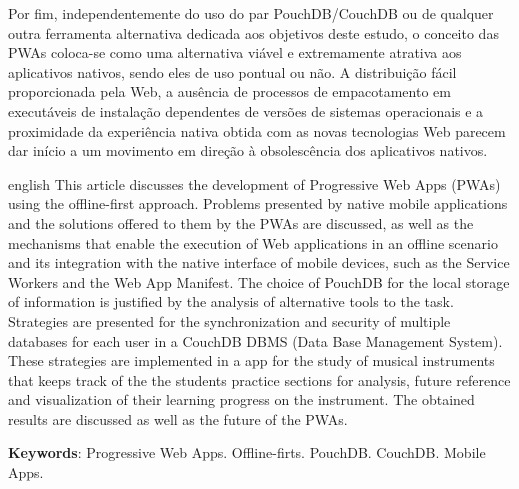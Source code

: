 \documentclass[
	article,			%
	11pt,				%
	oneside,			%
	a4paper,			%
	english,			%
	brazil,				%
	sumario=tradicional
	]{abntex2}
\begin{document}
Por fim, independentemente do uso do par PouchDB/CouchDB ou de qualquer outra ferramenta alternativa dedicada aos objetivos deste estudo, o conceito das PWAs coloca-se como uma alternativa viável e extremamente atrativa aos aplicativos nativos, sendo eles de uso pontual ou não. A distribuição fácil proporcionada pela Web, a ausência de processos de empacotamento em executáveis de instalação dependentes de versões de sistemas operacionais e a proximidade da experiência nativa obtida com as novas tecnologias Web parecem dar início a um movimento em direção à obsolescência dos aplicativos nativos.

\postextual



\emptythanks
\maketitle

\renewcommand{\resumoname}{Abstract}
\begin{resumoumacoluna}
 \begin{otherlanguage*}{english}
   This article discusses the development of Progressive Web Apps (PWAs) using
   the offline-first approach. Problems presented by native mobile applications and the solutions offered to them by the PWAs are discussed, as well as the mechanisms that enable the execution of Web applications in an offline scenario and its integration with the native interface of mobile devices, such as the Service Workers and the
   Web App Manifest. The choice of PouchDB for the local storage of information
   is justified by the analysis of alternative tools to the task. Strategies are
   presented for the synchronization and security of multiple databases for
   each user in a CouchDB DBMS (Data Base Management System). These strategies are implemented in a app for the study of musical instruments that keeps track of the the students practice sections for analysis, future reference and visualization of their learning progress on the instrument. The obtained results are discussed as well as the future of the PWAs. 

   \vspace{\onelineskip}
 
   \noindent
   \textbf{Keywords}: Progressive Web Apps. Offline-firts. PouchDB. CouchDB. Mobile Apps.
 \end{otherlanguage*}  
\end{resumoumacoluna}



\end{document}
